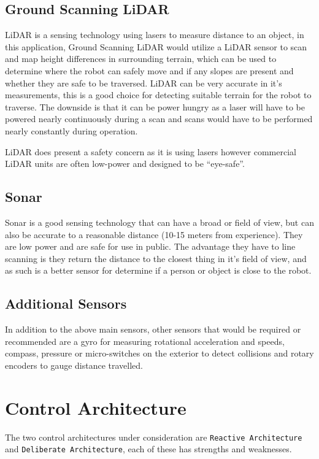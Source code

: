 \documentclass[10pt]{article}
\begin{document}
    \subsection{Ground Scanning LiDAR}
      LiDAR is a sensing technology using lasers to measure distance to an object, in this application, Ground Scanning LiDAR would utilize a LiDAR sensor to scan and map height differences in surrounding terrain, which can be used to determine where the robot can safely move and if any slopes are present and whether they are safe to be traversed. LiDAR can be very accurate in it's measurements, this is a good choice for detecting suitable terrain for the robot to traverse. The downside is that it can be power hungry as a laser will have to be powered nearly continuously during a scan and scans would have to be performed nearly constantly during operation.

      LiDAR does present a safety concern as it is using lasers however commercial LiDAR units are often low-power and designed to be ``eye-safe''.

    \subsection{Sonar}
      Sonar is a good sensing technology that can have a broad or field of view, but can also be accurate to a reasonable distance (10-15 meters from experience). They are low power and are safe for use in public. The advantage they have to line scanning is they return the distance to the closest thing in it's field of view, and as such is a better sensor for determine if a person or object is close to the robot.

    \subsection{Additional Sensors}
      In addition to the above main sensors, other sensors that would be required or recommended are a gyro for measuring rotational acceleration and speeds, compass, pressure or micro-switches on the exterior to detect collisions and rotary encoders to gauge distance travelled. 


  \section{Control Architecture}
    The two control architectures under consideration are \texttt{Reactive Architecture} and \texttt{Deliberate Architecture}, each of these has strengths and weaknesses.\\
\end{document}

